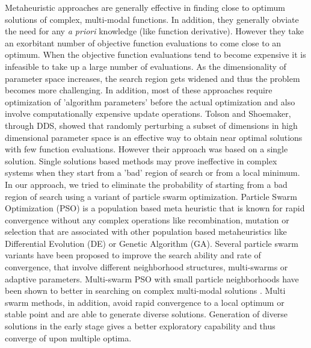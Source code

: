 \documentclass[12pt]{article}
\begin{document}
Metaheuristic approaches are generally effective in finding close to optimum solutions of complex, multi-modal functions. In addition, they generally obviate the need for any \textit{a priori} knowledge (like function derivative). However they take an exorbitant number of objective function evaluations to come close to an optimum. When the objective function evaluations tend to become expensive it is infeasible to take up a large number of evaluations. As the dimensionality of parameter space increases, the search region gets widened and thus the problem becomes more challenging.  In addition, most of these approaches require optimization of  'algorithm parameters' before the actual optimization and also involve computationally expensive update operations.  Tolson and Shoemaker, through DDS, showed that randomly perturbing a subset of dimensions in high dimensional parameter space is an effective way to obtain near optimal solutions with few function evaluations. However their approach was based on a single solution. Single solutions based methods may prove ineffective in complex systems when they start from a 'bad' region of search or from a local minimum. In our approach, we tried to eliminate the probability of starting from a bad region of search using a variant of particle swarm optimization. Particle Swarm Optimization (PSO) is a population based meta heuristic that is known for rapid convergence without any complex operations like recombination, mutation or selection that are associated with other population based metaheuristics like Differential Evolution (DE) or Genetic Algorithm (GA). Several particle swarm variants have been proposed to improve the search ability and rate of convergence, that involve different neighborhood structures, multi-swarms or adaptive parameters. Multi-swarm PSO with small particle neighborhoods have been shown to better in searching on complex multi-modal solutions \cite{zhao2008dynamic}. Multi swarm methods, in addition, avoid rapid convergence to a local optimum or stable point and are able to generate diverse solutions.  Generation of diverse solutions in the early stage gives a better exploratory capability and thus converge of upon multiple optima.
\end{document}
